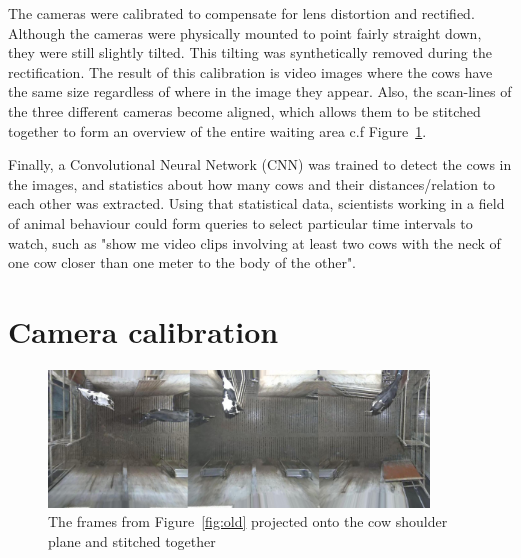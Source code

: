 \documentclass{cta-author}
\begin{document}
The cameras were calibrated to compensate for lens distortion and rectified. Although the cameras were 
physically mounted to point fairly straight down, they were still slightly tilted. This tilting was 
synthetically removed during the rectification. The result of this calibration is video images where the cows 
have the same size regardless of where in the image they appear. Also, the scan-lines of the three different 
cameras become aligned, which allows them to be stitched together to form an overview of the entire waiting 
area c.f Figure~\ref{fig:stitch}.

Finally, a Convolutional Neural Network (CNN)  was trained to detect the cows in the images, and statistics 
about how many cows and their distances/relation to each other was extracted. Using that statistical data, 
scientists working in a field of animal behaviour could form queries to select particular time intervals to 
watch, such as "show me video clips involving at least two cows with the neck of one cow closer than one 
meter to the body of the other".


\section{Camera calibration}

\begin{figure}[t]
\begin{center}
  \includegraphics[width=0.9\textwidth]{full.jpg}
\end{center}
  \caption{The frames from Figure~\ref{fig:old} projected onto the cow shoulder plane and stitched together}
  \label{fig:stitch}
\end{figure}
\end{document}
